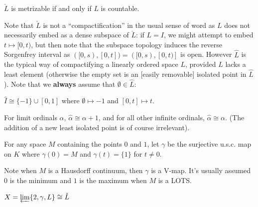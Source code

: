 \documentclass[11pt]{article}
\begin{document}
  \begin{corollary}
    \(\check L\) is metrizable if and only if \(L\) is countable.
  \end{corollary}

  Note that \(\check L\)
  is not a ``compactification'' in the usual sense of word
  as \(L\) does not necessarily
  embed as a dense subspace of \(\check L\): if \(L=I\), we might attempt to embed
  \(t\mapsto [0,t)\), but then note that the subspace topology induces the
  reverse Sorgenfrey interval as \(([0,s),[0,t])=([0,s),[0,t)]\) is open.
  However \(\hat L\) is
  the typical way of compactifying a linearly ordered space \(L\),
  provided \(L\) lacks a least element (otherwise the empty set is an [easily
  removable] isolated point in \(\hat L\)). Note that we \textbf{always}
  assume that \(\emptyset\in\hat L\):

  \begin{example}
    \(\hat I\cong\{-1\}\cup [0,1]\) where
    \(\emptyset\mapsto-1\) and \([0,t]\mapsto t\).
  \end{example}

  \begin{example}
    For limit ordinals \(\alpha\), \(\hat \alpha\cong \alpha+1\),
    and for all other infinite ordinals, \(\hat\alpha\cong\alpha\).
    (The addition of a new least isolated point is of course irrelevant).
  \end{example}

  \begin{definition}
    For any space \(M\) containing the points \(0\) and \(1\),
    let \(\gamma\) be the surjective u.s.c. map on \(K\) where
    \(\gamma(0)=M\) and \(\gamma(t)=\{1\}\)
    for \(t\not=0\).
  \end{definition}

  Note when \(M\) is a Hausdorff continuum, then \(\gamma\) is a V-map.
  It's usually assumed \(0\) is the minimum and \(1\) is the maximum
  when \(M\) is a LOTS.

  \begin{theorem}
    \(X=\varprojlim \{2, \gamma, L\}\cong \check L\)
  \end{theorem}
\end{document}
